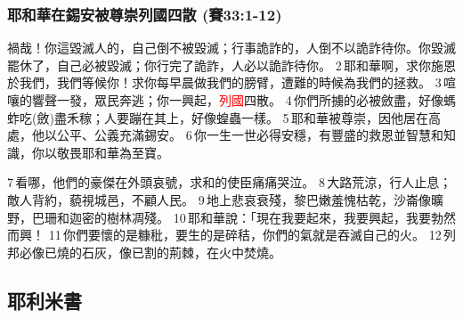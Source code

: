 \subsubsection{耶和華在錫安被尊崇列國四散 (賽33:1-12)}
禍哉！你這毀滅人的，自己倒不被毀滅；行事詭詐的，人倒不以詭詐待你。你毀滅罷休了，自己必被毀滅；你行完了詭詐，人必以詭詐待你。 2 耶和華啊，求你施恩於我們，我們等候你！求你每早晨做我們的膀臂，遭難的時候為我們的拯救。 3 喧嚷的響聲一發，眾民奔逃；你一興起，\textcolor{red}{列國}四散。 4 你們所擄的必被斂盡，好像螞蚱吃(斂)盡禾稼；人要蹦在其上，好像蝗蟲一樣。 5 耶和華被尊崇，因他居在高處，他以公平、公義充滿錫安。 6 你一生一世必得安穩，有豐盛的救恩並智慧和知識，你以敬畏耶和華為至寶。

7 看哪，他們的豪傑在外頭哀號，求和的使臣痛痛哭泣。 8 大路荒涼，行人止息；敵人背約，藐視城邑，不顧人民。 9 地上悲哀衰殘，黎巴嫩羞愧枯乾，沙崙像曠野，巴珊和迦密的樹林凋殘。 10 耶和華說：「現在我要起來，我要興起，我要勃然而興！ 11 你們要懷的是糠秕，要生的是碎秸，你們的氣就是吞滅自己的火。 12 列邦必像已燒的石灰，像已割的荊棘，在火中焚燒。

\subsection{耶利米書}
